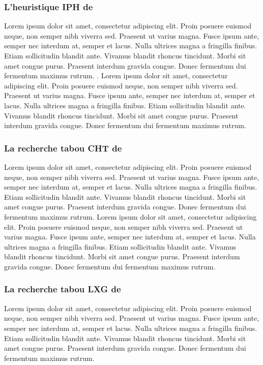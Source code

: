 \subsubsection{L'heuristique IPH de \parencite{gulczynski_period_2011}}
Lorem ipsum dolor sit amet, consectetur adipiscing elit. Proin posuere euismod neque, non semper nibh viverra sed. Praesent ut varius magna. Fusce ipsum ante, semper nec interdum at, semper et lacus. Nulla ultrices magna a fringilla finibus. Etiam sollicitudin blandit ante. Vivamus blandit rhoncus tincidunt. Morbi sit amet congue purus. Praesent interdum gravida congue. Donec fermentum dui fermentum maximus rutrum. \parencite{chao_new_1995}. Lorem ipsum dolor sit amet, consectetur adipiscing elit. Proin posuere euismod neque, non semper nibh viverra sed. Praesent ut varius magna. Fusce ipsum ante, semper nec interdum at, semper et lacus. Nulla ultrices magna a fringilla finibus. Etiam sollicitudin blandit ante. Vivamus blandit rhoncus tincidunt. Morbi sit amet congue purus. Praesent interdum gravida congue. Donec fermentum dui fermentum maximus rutrum.

\medskip


\subsubsection{La recherche tabou CHT de \parencite{cacchiani_set-covering_2014}}
Lorem ipsum dolor sit amet, consectetur adipiscing elit. Proin posuere euismod neque, non semper nibh viverra sed. Praesent ut varius magna. Fusce ipsum ante, semper nec interdum at, semper et lacus. Nulla ultrices magna a fringilla finibus. Etiam sollicitudin blandit ante. Vivamus blandit rhoncus tincidunt. Morbi sit amet congue purus. Praesent interdum gravida congue. Donec fermentum dui fermentum maximus rutrum. \parencite{hemmelmayr_variable_2009} Lorem ipsum dolor sit amet, consectetur adipiscing elit. Proin posuere euismod neque, non semper nibh viverra sed. Praesent ut varius magna. Fusce ipsum ante, semper nec interdum at, semper et lacus. Nulla ultrices magna a fringilla finibus. Etiam sollicitudin blandit ante. Vivamus blandit rhoncus tincidunt. Morbi sit amet congue purus. Praesent interdum gravida congue. Donec fermentum dui fermentum maximus rutrum.

\medskip


\subsubsection{La recherche tabou LXG de \parencite{liu_hybridization_2014}}
Lorem ipsum dolor sit amet, consectetur adipiscing elit. Proin posuere euismod neque, non semper nibh viverra sed. Praesent ut varius magna. Fusce ipsum ante, semper nec interdum at, semper et lacus. Nulla ultrices magna a fringilla finibus. Etiam sollicitudin blandit ante. Vivamus blandit rhoncus tincidunt. Morbi sit amet congue purus. Praesent interdum gravida congue. Donec fermentum dui fermentum maximus rutrum.

